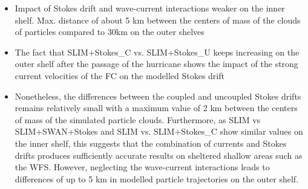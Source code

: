 \documentclass[11pt,a4paper]{article}
\begin{document}
\begin{itemize}
    \item Impact of Stokes drift and wave-current interactions weaker on the inner shelf. Max. distance of about 5 km between the centers of mass of the clouds of particles compared to 30km on the outer shelves
    \item The fact that SLIM+Stokes\_C vs. SLIM+Stokes\_U keeps increasing on the outer shelf after the passage of the hurricane shows the impact of the strong current velocities of the FC on the modelled Stokes drift
    \item Nonetheless, the differences between the coupled and uncoupled Stokes drifts remains relatively small with a maximum value of 2 km between the centers of mass of the simulated particle clouds. Furthermore, as SLIM vs SLIM+SWAN+Stokes and SLIM vs. SLIM+Stokes\_C show similar values on the inner shelf, this suggests that the combination of currents and Stokes drifts produces sufficiently accurate results on sheltered shallow areas such as the WFS. However, neglecting the wave-current interactions leads to differences of up to 5 km in modelled particle trajectories on the outer shelf. 
\end{itemize}
\end{document}
